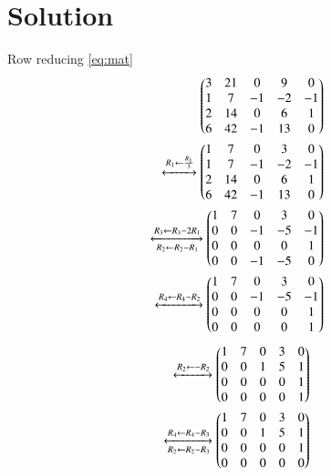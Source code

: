\documentclass[journal,12pt,twocolumn]{IEEEtran}
\begin{document}
\section{Solution}
Row reducing \eqref{eq:mat}
\begin{align}
\begin{pmatrix}3&21&0&9&0\\1&7&-1&-2&-1\\2&14&0&6&1\\6&42&-1&13&0\end{pmatrix} \nonumber\\
\xleftrightarrow[]{R_1\leftarrow\frac{R_1}{3}}
\begin{pmatrix}1&7&0&3&0\\1&7&-1&-2&-1\\2&14&0&6&1\\6&42&-1&13&0\end{pmatrix} \nonumber \\
\xleftrightarrow[R_2\leftarrow R_2-R_1]{R_3\leftarrow R_3-2R_1}\begin{pmatrix}1&7&0&3&0\\0&0&-1&-5&-1\\0&0&0&0&1\\0&0&-1&-5&0\end{pmatrix}  \nonumber\\
\xleftrightarrow[]{R_4\leftarrow R_4-R_2}\begin{pmatrix}1&7&0&3&0\\0&0&-1&-5&-1\\0&0&0&0&1\\0&0&0&0&1\end{pmatrix}  \nonumber
\end{align}
\begin{align}
\xleftrightarrow[]{R_2\leftarrow -R_2}\begin{pmatrix}1&7&0&3&0\\0&0&1&5&1\\0&0&0&0&1\\0&0&0&0&1\end{pmatrix}  \nonumber\\
\xleftrightarrow[R_2\leftarrow R_2-R_3]{R_4\leftarrow R_4-R_3}\begin{pmatrix}1&7&0&3&0\\0&0&1&5&1\\0&0&0&0&1\\0&0&0&0&0\end{pmatrix} \label{eq:rref}
\end{align}
\end{document}
